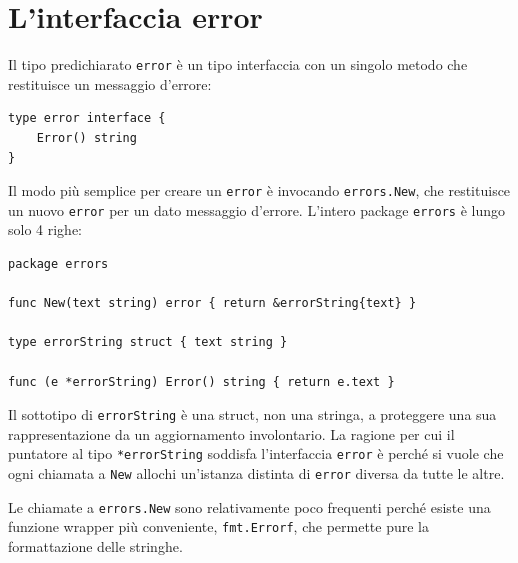 \section{L'interfaccia error}
\label{sec:interfaccia_error}%
Il tipo predichiarato \verb|error| è un tipo interfaccia con un singolo metodo che restituisce un messaggio d'errore:
\begin{lstlisting}[frame=single, label={lst:lstlisting6-6.1}]
type error interface {
    Error() string
}
\end{lstlisting}
Il modo più semplice per creare un \verb|error| è invocando \verb|errors.New|, che restituisce un nuovo \verb|error| per un dato messaggio d'errore.
L'intero package \verb|errors| è lungo solo 4 righe:
\begin{lstlisting}[frame=single, label={lst:lstlisting6-6.2}]
package errors

func New(text string) error { return &errorString{text} }

type errorString struct { text string }

func (e *errorString) Error() string { return e.text }
\end{lstlisting}
Il sottotipo di \verb|errorString| è una struct, non una stringa, a proteggere una sua rappresentazione da un aggiornamento involontario.
La ragione per cui il puntatore al tipo \verb|*errorString| soddisfa l'interfaccia \verb|error| è perché si vuole che ogni chiamata a \verb|New| allochi un'istanza distinta di \verb|error| diversa da tutte le altre.

Le chiamate a \verb|errors.New| sono relativamente poco frequenti perché esiste una funzione wrapper più conveniente, \verb|fmt.Errorf|, che permette pure la formattazione delle stringhe.